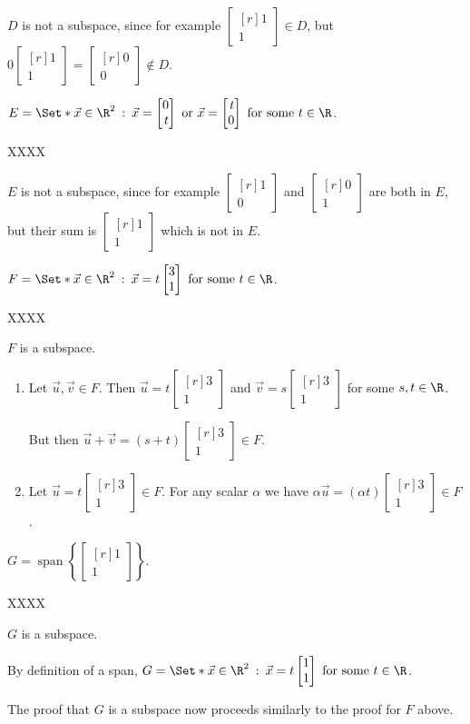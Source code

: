 \documentclass{problemset}
\DeclareMathOperator{\Span}{span}
\newcommand{\mat}[1]{\begin{bmatrix*}[r]#1\end{bmatrix*}}
\providecommand\given{}
\newcommand\SetSymbol[1][]{%
	\nonscript\::%
	\allowbreak
	\nonscript\:
	\mathopen{}}
\renewcommand\given{\SetSymbol[\delimsize]}
\begin{document}
\begin{parts}
\begin{solution}
				$D$ is not a subspace, since for example $\mat{1\\1}\in D$, but
				$0\mat{1\\1}=\mat{0\\0}\notin D$. 
			\end{solution}
		\item $E=\Set*{\vec x\in\R^2 \given \vec x=\mat{0\\t}\text{ or }\vec x=\mat{t\\0}\text{ for some }t\in\R}$.
			\begin{solution}
				XXXX

				$E$ is not a subspace, since for example  $\mat{1\\0}$ and $\mat{0\\1}$
				are both in $E$, but their sum is $\mat{1\\1}$ which is not in $E$.
			\end{solution}
		\item $F=\Set*{\vec x\in\R^2 \given \vec x=t\mat{3\\1}\text{ for some }t\in\R}$.
			\begin{solution}
				XXXX
					
				$F$ is a subspace.

				\begin{enumerate}[label=(\roman*)]
					\item Let $\vec u,\vec v\in F$. Then $\vec u=t\mat{3\\1}$ and
						$\vec v=s\mat{3\\1}$ for some $s,t\in\R$. 

						But then $\vec u+\vec v=(s+t)\mat{3\\1}\in F$. 
					\item Let $\vec u=t\mat{3\\1}\in F$. For any scalar $\alpha$
						we have $\alpha\vec u=(\alpha t)\mat{3\\1}\in F$. 
				\end{enumerate}
			\end{solution}
		\item $G=\Span\left\{\mat{1\\1}\right\}$.
			\begin{solution}
				XXXX
					
				$G$ is a subspace. 

				By definition of a span,
				$G=\Set*{\vec x\in\R^2 \given \vec x=t\mat{1\\1}\text{ for some }t\in\R}$.

				The proof that $G$ is a subspace now proceeds similarly to the
				proof for $F$ above.


\end{solution}
\end{parts}
\end{document}
